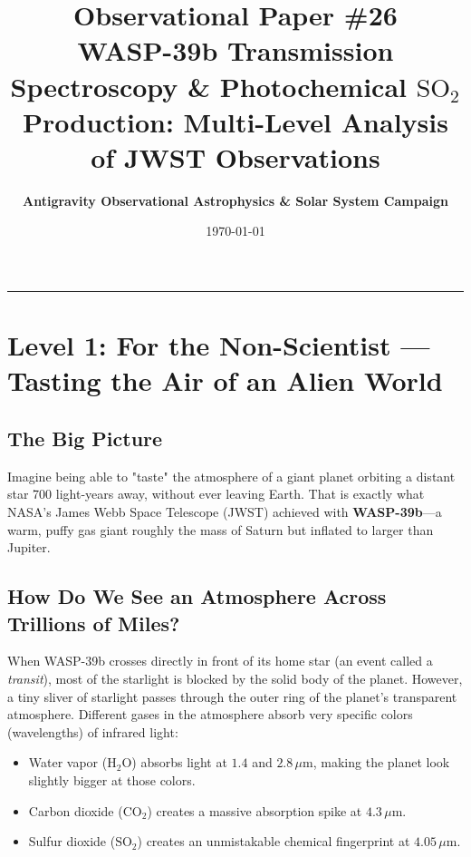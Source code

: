 \documentclass[11pt,a4paper]{article}
\title{\Huge \textbf{Observational Paper \#26}\\ \Large WASP-39b Transmission Spectroscopy \& Photochemical $\mathrm{SO_2}$ Production: Multi-Level Analysis of JWST Observations}
\author{\textbf{Antigravity Observational Astrophysics \& Solar System Campaign}}
\date{\today}
\begin{document}
\maketitle

\vspace{-1em}
\begin{center}
\rule{\textwidth}{1.5pt}
\end{center}

\section*{Level 1: For the Non-Scientist — Tasting the Air of an Alien World}

\subsection*{The Big Picture}
Imagine being able to "taste" the atmosphere of a giant planet orbiting a distant star 700 light-years away, without ever leaving Earth. That is exactly what NASA's James Webb Space Telescope (JWST) achieved with \textbf{WASP-39b}—a warm, puffy gas giant roughly the mass of Saturn but inflated to larger than Jupiter. 

\subsection*{How Do We See an Atmosphere Across Trillions of Miles?}
When WASP-39b crosses directly in front of its home star (an event called a \textit{transit}), most of the starlight is blocked by the solid body of the planet. However, a tiny sliver of starlight passes through the outer ring of the planet's transparent atmosphere. Different gases in the atmosphere absorb very specific colors (wavelengths) of infrared light:
\begin{itemize}
    \item Water vapor ($\mathrm{H_2O}$) absorbs light at $1.4$ and $2.8\,\mu\mathrm{m}$, making the planet look slightly bigger at those colors.
    \item Carbon dioxide ($\mathrm{CO_2}$) creates a massive absorption spike at $4.3\,\mu\mathrm{m}$.
    \item Sulfur dioxide ($\mathrm{SO_2}$) creates an unmistakable chemical fingerprint at $4.05\,\mu\mathrm{m}$.
\end{itemize}
\end{document}
